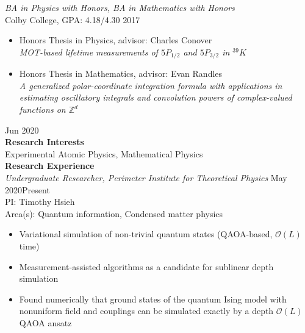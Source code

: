 \documentclass[10pt]{article}
\begin{document}
\noindent \textit{BA in Physics with Honors, BA in Mathematics with Honors}\\
Colby College, GPA: 4.18/4.30 \hfill 2017 


\begin{itemize}
	\item \indent Honors Thesis in Physics, advisor: Charles Conover\\
	\textit{MOT-based lifetime measurements of $5P_{1/2}$ and $5P_{3/2}$ in $^{39}K$}
	
	\item Honors Thesis in Mathematics, advisor: Evan Randles\\ 
	\indent \textit{A generalized polar-coordinate integration formula with applications in estimating oscillatory integrals and convolution powers of complex-valued functions on $\mathbb{Z}^d$}
\end{itemize}



\hfill  Jun 2020\\




\noindent \large{\textbf{{Research Interests}}}   \normalsize \\  
\noindent Experimental Atomic Physics, Mathematical Physics\\



\noindent \large{\textbf{{Research Experience}}}   \normalsize \\  
\noindent \textit{Undergraduate Researcher, Perimeter Institute for Theoretical Physics} \hfill May 2020\textendash Present\\
PI: Timothy Hsieh \\
Area(s): Quantum information, Condensed matter physics \vspace{-5pt}
\begin{itemize}
	\setlength\itemsep{-4pt}
	\item Variational simulation of non-trivial quantum states (QAOA-based, $\mathcal{O}(L)$ time)  
	\item Measurement-assisted algorithms as a candidate for sublinear depth simulation  
	\item Found numerically that ground states of the quantum Ising model with nonuniform field and couplings can be simulated exactly by a depth $\mathcal{O}(L)$ QAOA ansatz
\end{itemize}
\end{document}
